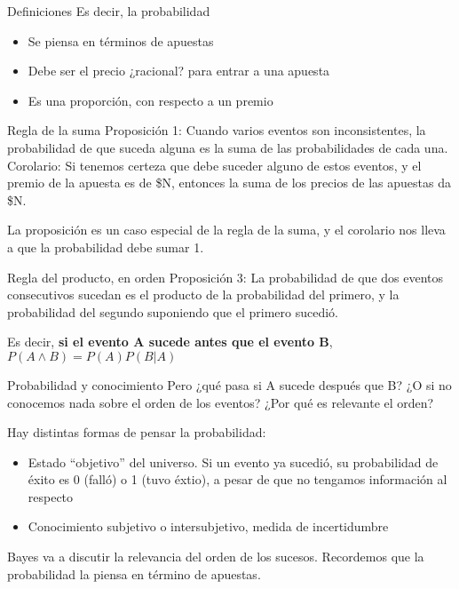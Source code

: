\documentclass{beamer}
\begin{document}
\begin{frame}{Definiciones}
	Es decir, la probabilidad
	\begin{itemize}
		\item Se piensa en términos de apuestas
		\item Debe ser el precio ¿racional? para entrar a una apuesta
		\item Es una proporción, con respecto a un premio
	\end{itemize}
\end{frame}

\begin{frame}{Regla de la suma}
	Proposición 1: Cuando varios eventos son inconsistentes, la probabilidad de que suceda alguna es la suma de las probabilidades de cada una.
	Corolario: Si tenemos certeza que debe suceder alguno de estos eventos, y el premio de la apuesta es de \$N, entonces la suma de los precios de las apuestas da \$N.

	La proposición es un caso especial de la regla de la suma, y el corolario nos lleva a que la probabilidad debe sumar 1.
\end{frame}

\begin{frame}{Regla del producto, en orden}
	Proposición 3: La probabilidad de que dos eventos consecutivos sucedan es el producto de la probabilidad del primero, y la probabilidad del segundo suponiendo que el primero sucedió.

	Es decir, \textbf{si el evento A sucede antes que el evento B}, $P(A \land B) = P(A) P(B|A)$
\end{frame}

\begin{frame}{Probabilidad y conocimiento}
	Pero ¿qué pasa si A sucede después que B? ¿O si no conocemos nada sobre el orden de los eventos? ¿Por qué es relevante el orden?\pause

	Hay distintas formas de pensar la probabilidad:
	\begin{itemize}
		\item Estado ``objetivo'' del universo. Si un evento ya sucedió, su probabilidad de éxito es 0 (falló) o 1 (tuvo éxtio), a pesar de que no tengamos información al respecto
		\item Conocimiento subjetivo o intersubjetivo, medida de incertidumbre
	\end{itemize}
	\pause

	Bayes va a discutir la relevancia del orden de los sucesos.
	Recordemos que la probabilidad la piensa en término de apuestas.
\end{frame}
\end{document}
